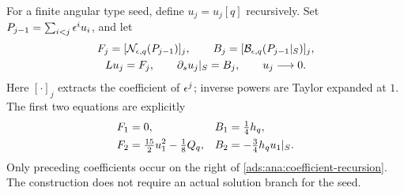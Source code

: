For a finite angular type seed, define $u_j=u_j[q]$ recursively.
Set $P_{j-1}=\sum_{i<j}\epsilon^iu_i$, and let
\begin{equation}
 \begin{gathered}
 F_j=[\mathcal N_{\epsilon,q}(P_{j-1})]_j,
 \qquad B_j=[\mathcal B_{\epsilon,q}(P_{j-1}|_S)]_j,\\
 Lu_j=F_j,\qquad \partial_su_j|_S=B_j,
 \qquad u_j\longrightarrow0.
 \end{gathered}
 \label{ads:ana:coefficient-recursion}
\end{equation}
Here $[\cdot]_j$ extracts the coefficient of $\epsilon^j$; inverse powers
are Taylor expanded at $1$.  The first two equations are explicitly
\begin{align}
 F_1&=0,& B_1&=\tfrac14h_q,\notag\\
 F_2&=\tfrac{15}{2}u_1^2-\tfrac18Q_q,
 & B_2&=-\tfrac34h_qu_1|_S.
 \label{ads:ana:first-two}
\end{align}
Only preceding coefficients occur on the right of
\eqref{ads:ana:coefficient-recursion}.  The construction does not require
an actual solution branch for the seed.

